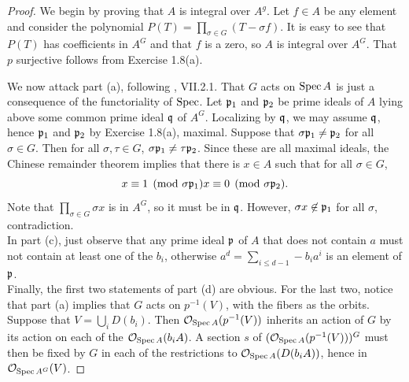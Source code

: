 \begin{proof}
	We begin by proving that $A$ is integral over $A^g$. Let $f \in A$ be
	any element and consider the polynomial $P(T) = \prod_{\sigma \in G}
	(T - \sigma f)$. It is easy to see that $P(T)$ has coefficients in
	$A^G$ and that $f$ is a zero, so $A$ is integral over $A^G$. That $p$
	surjective follows from Exercise 1.8(a).

	We now attack part (a), following \cite{algebra}, VII.2.1. That $G$ acts
	on $\operatorname{Spec} A$ is just a consequence of the functoriality of $\operatorname{Spec}$. Let
	$\mathfrak{p}_1$ and $\mathfrak{p}_2$ be prime ideals of $A$ lying above some
	common prime ideal $\mathfrak{q}$ of $A^G$. Localizing by $\mathfrak{q}$, we may
	assume $\mathfrak{q}$, hence $\mathfrak{p}_1$ and $\mathfrak{p}_2$ by Exercise 1.8(a),
	maximal. Suppose that $\sigma \mathfrak{p}_1 \neq \mathfrak{p}_2$ for all
	$\sigma \in G$. Then for all $\sigma, \tau \in G$, $\sigma \mathfrak{p}_1
	\neq \tau \mathfrak{p}_2$. Since these are all maximal ideals, the Chinese
	remainder theorem implies that there is $x \in A$ such that for all
	$\sigma \in G$, 
	\[
		x \equiv 1 \pmod {\sigma \mathfrak{p}_1}\\
		x \equiv 0 \pmod {\sigma \mathfrak{p}_2}.
	\]
	Note that $\prod_{\sigma \in G} \sigma x$ is in $A^G$, so it must be in
	$\mathfrak{q}$. However, $\sigma x \not\in \mathfrak{p}_1$ for all $\sigma$,
	contradiction.\\

	In part (c), just observe that any prime ideal $\mathfrak{p}$ of $A$ that
	does not contain $a$ must not contain at least one of the $b_i$,
	otherwise $a^d = \sum_{i \leq d-1} -b_ia^i$ is an element of $\mathfrak{p}$.
	\\

	Finally, the first two statements of part (d) are obvious. For the last
	two, notice that part (a) implies that $G$ acts on $p^{-1}(V)$, with the
	fibers as the orbits. Suppose that $V = \bigcup_i D(b_i)$. Then
	$\mathcal{O}_{\operatorname{Spec} A}(p^{-1}(V))$ inherits an action of $G$ by its action on
	each of the $\mathcal{O}_{\operatorname{Spec} A}(b_iA)$. A section $s$ of
	$(\mathcal{O}_{\operatorname{Spec} A}(p^{-1}(V)))^G$ must then be fixed by $G$ in each of the
	restrictions to $\mathcal{O}_{\operatorname{Spec} A}(D(b_iA))$, hence in $\mathcal{O}_{\operatorname{Spec} A^G}(V)$.
\end{proof}
